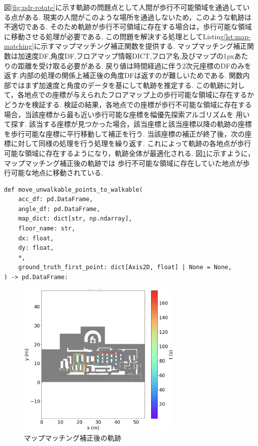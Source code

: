 
図\ref{fig:pdr-rotate}に示す軌跡の問題点として人間が歩行不可能領域を通過している点がある.
現実の人間がこのような場所を通過しないため，このような軌跡は不適切である.
そのため軌跡が歩行不可領域に存在する場合は，歩行可能な領域に移動させる処理が必要である.
この問題を解決する処理としてListing\ref{lst:map-matching}に示すマップマッチング補正関数を提供する.
マップマッチング補正関数は加速度DF,角度DF,フロアマップ情報DICT,フロア名,及びマップの1pxあたりの距離を受け取る必要がある.
戻り値は時間経過に伴う2次元座標のDFのみを返す.内部の処理の関係上補正後の角度DFは返すのが難しいためである.
関数内部ではまず加速度と角度のデータを基にして軌跡を推定する.
この軌跡に対して，各地点での座標が与えられたフロアマップ上の歩行可能な領域に存在するかどうかを検証する.
検証の結果，各地点での座標が歩行不可能な領域に存在する場合，当該座標から最も近い歩行可能な座標を幅優先探索アルゴリズムを
用いて探す.
該当する座標が見つかった場合，該当座標と該当座標以降の軌跡の座標を歩行可能な座標に平行移動して補正を行う.
当該座標の補正が終了後，次の座標に対して同様の処理を行う処理を繰り返す.
これによって軌跡の各地点が歩行可能な領域に存在するようになり，軌跡全体が最適化される.
図\ref{fig:map-matching}に示すように，マップマッチング補正後の軌跡では
歩行不可能な領域に存在していた地点が歩行可能な地点に移動されている.

\begin{lstlisting}[caption={マップマッチング補正}, label=lst:map-matching]
def move_unwalkable_points_to_walkable(
    acc_df: pd.DataFrame,
    angle_df: pd.DataFrame,
    map_dict: dict[str, np.ndarray],
    floor_name: str,
    dx: float,
    dy: float,
    *,
    ground_truth_first_point: dict[Axis2D, float] | None = None,
) -> pd.DataFrame:

\end{lstlisting}

\begin{figure}[h]
	\centering
	\includegraphics[width=80mm]{image/map-matching.jpg}
	\caption{マップマッチング補正後の軌跡}    \label{fig:map-matching}
\end{figure}

